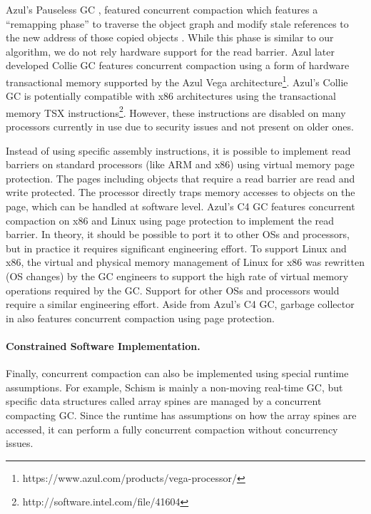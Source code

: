 \documentclass[sigplan,10pt,review,anonymous]{acmart}\settopmatter{printfolios=true,printccs=false,printacmref=false}
\newcommand{\egb}[1]{\color{blue}\fbox{\bfseries\sffamily\scriptsize Elisa:}{\sf\small$\blacktriangleright$\textit{#1}$\blacktriangleleft$}\color{black}}
\begin{document}
Azul's Pauseless GC \cite{AzulHardwareReadBarrierConcCompact}, featured concurrent compaction which features a ``remapping phase'' to traverse the object graph and modify stale references to the new address of those copied objects .
While this phase is similar to our algorithm, we do not rely hardware support for the read barrier. 
Azul later developed Collie GC \cite{AzulSTMConcCompact} features concurrent compaction using a form of hardware transactional memory supported by the Azul Vega architecture\footnote{https://www.azul.com/products/vega-processor/}. 
Azul's Collie GC is potentially compatible with x86 architectures using the transactional memory TSX instructions\footnote{http://software.intel.com/file/41604}.
However, these instructions are disabled on many processors currently in use due to security issues and not present on older ones.
 
 Instead of using specific assembly instructions, it is possible to implement read barriers on standard processors (like ARM and x86) using virtual memory page protection. The pages including objects that require a read barrier are read and write protected. The processor directly traps memory accesses to objects on the page, which can be handled at software level. 
Azul's C4 GC \cite{AzulVirtualMemConcCompact} features concurrent compaction on x86 and Linux using page protection to implement the read barrier. In theory, it should be possible to port it to other OSs and processors, but in practice it requires significant engineering effort. To support Linux and x86, the virtual and physical memory management of Linux for x86 was rewritten (OS changes) by the GC engineers to support the high rate of virtual memory operations required by the GC. Support for other OSs and processors would require a similar engineering effort.
Aside from Azul's C4 GC, garbage collector in \cite{CompressorVirtualMemConcCompact} also features concurrent compaction using page protection.

\paragraph{Constrained Software Implementation.}
Finally, concurrent compaction can also be implemented using special runtime assumptions. For example, Schism \cite{SchismRTGC} is mainly a non-moving real-time GC, but specific data structures called array spines are managed by a concurrent compacting GC. Since the runtime has assumptions on how the array spines are accessed, it can perform a fully concurrent compaction without concurrency issues.
\end{document}
